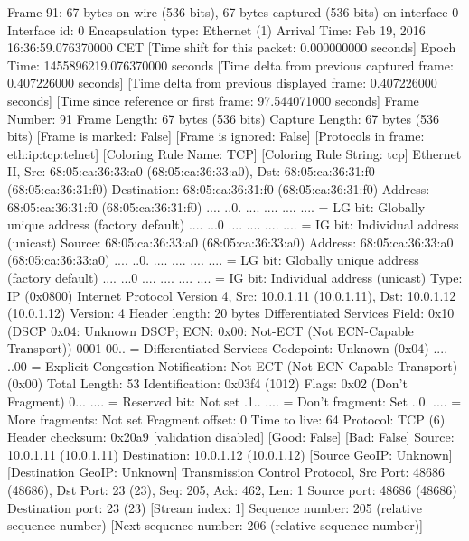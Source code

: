 Frame 91: 67 bytes on wire (536 bits), 67 bytes captured (536 bits) on interface 0
    Interface id: 0
    Encapsulation type: Ethernet (1)
    Arrival Time: Feb 19, 2016 16:36:59.076370000 CET
    [Time shift for this packet: 0.000000000 seconds]
    Epoch Time: 1455896219.076370000 seconds
    [Time delta from previous captured frame: 0.407226000 seconds]
    [Time delta from previous displayed frame: 0.407226000 seconds]
    [Time since reference or first frame: 97.544071000 seconds]
    Frame Number: 91
    Frame Length: 67 bytes (536 bits)
    Capture Length: 67 bytes (536 bits)
    [Frame is marked: False]
    [Frame is ignored: False]
    [Protocols in frame: eth:ip:tcp:telnet]
    [Coloring Rule Name: TCP]
    [Coloring Rule String: tcp]
Ethernet II, Src: 68:05:ca:36:33:a0 (68:05:ca:36:33:a0), Dst: 68:05:ca:36:31:f0 (68:05:ca:36:31:f0)
    Destination: 68:05:ca:36:31:f0 (68:05:ca:36:31:f0)
        Address: 68:05:ca:36:31:f0 (68:05:ca:36:31:f0)
        .... ..0. .... .... .... .... = LG bit: Globally unique address (factory default)
        .... ...0 .... .... .... .... = IG bit: Individual address (unicast)
    Source: 68:05:ca:36:33:a0 (68:05:ca:36:33:a0)
        Address: 68:05:ca:36:33:a0 (68:05:ca:36:33:a0)
        .... ..0. .... .... .... .... = LG bit: Globally unique address (factory default)
        .... ...0 .... .... .... .... = IG bit: Individual address (unicast)
    Type: IP (0x0800)
Internet Protocol Version 4, Src: 10.0.1.11 (10.0.1.11), Dst: 10.0.1.12 (10.0.1.12)
    Version: 4
    Header length: 20 bytes
    Differentiated Services Field: 0x10 (DSCP 0x04: Unknown DSCP; ECN: 0x00: Not-ECT (Not ECN-Capable Transport))
        0001 00.. = Differentiated Services Codepoint: Unknown (0x04)
        .... ..00 = Explicit Congestion Notification: Not-ECT (Not ECN-Capable Transport) (0x00)
    Total Length: 53
    Identification: 0x03f4 (1012)
    Flags: 0x02 (Don't Fragment)
        0... .... = Reserved bit: Not set
        .1.. .... = Don't fragment: Set
        ..0. .... = More fragments: Not set
    Fragment offset: 0
    Time to live: 64
    Protocol: TCP (6)
    Header checksum: 0x20a9 [validation disabled]
        [Good: False]
        [Bad: False]
    Source: 10.0.1.11 (10.0.1.11)
    Destination: 10.0.1.12 (10.0.1.12)
    [Source GeoIP: Unknown]
    [Destination GeoIP: Unknown]
Transmission Control Protocol, Src Port: 48686 (48686), Dst Port: 23 (23), Seq: 205, Ack: 462, Len: 1
    Source port: 48686 (48686)
    Destination port: 23 (23)
    [Stream index: 1]
    Sequence number: 205    (relative sequence number)
    [Next sequence number: 206    (relative sequence number)]
